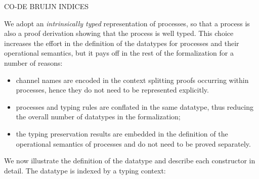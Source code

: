 CO-DE BRUIJN INDICES

We adopt an \emph{intrinsically typed} representation of processes, so that a
process is also a proof derivation showing that the process is well typed. This
choice increases the effort in the definition of the datatypes for processes and
their operational semantics, but it pays off in the rest of the formalization
for a number of reasons:

\begin{itemize}
\item channel names are encoded in the context splitting proofs occurring within
  processes, hence they do not need to be represented explicitly.
\item processes and typing rules are conflated in the same datatype, thus
  reducing the overall number of datatypes in the formalization;
\item the typing preservation results are embedded in the definition of the
  operational semantics of processes and do not need to be proved separately.
\end{itemize}

We now illustrate the definition of the  datatype and
describe each constructor in detail. The datatype is indexed by a typing
context:

